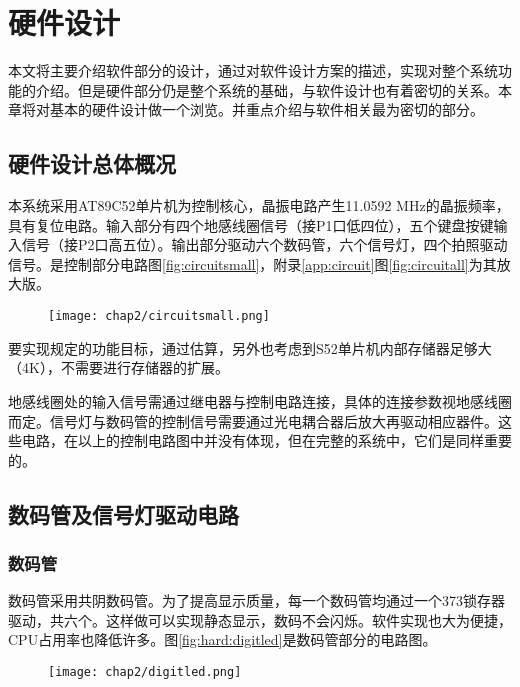 

\chapter{硬件设计}
\label{chap:hardware}
	本文将主要介绍软件部分的设计，通过对软件设计方案的描述，实现对整个系统功能的介绍。但是硬件部分仍是整个系统的基础，与软件设计也有着密切的关系。本章将对基本的硬件设计做一个浏览。并重点介绍与软件相关最为密切的部分。
\section{硬件设计总体概况}
	本系统采用AT89C52单片机为控制核心，晶振电路产生11.0592 MHz的晶振频率，具有复位电路。输入部分有四个地感线圈信号（接P1口低四位），五个键盘按键输入信号（接P2口高五位）。输出部分驱动六个数码管，六个信号灯，四个拍照驱动信号。是控制部分电路图\ref{fig:circuitsmall}，附录\ref{app:circuit}图\ref{fig:circuitall}为其放大版。
	
\begin{figure}[!tbh]
  \centering
  \texttt{[image: chap2/circuitsmall.png]}
\end{figure}
	要实现规定的功能目标，通过估算，另外也考虑到S52单片机内部存储器足够大（4K），不需要进行存储器的扩展。
	
	地感线圈处的输入信号需通过继电器与控制电路连接，具体的连接参数视地感线圈而定。信号灯与数码管的控制信号需要通过光电耦合器后放大再驱动相应器件。这些电路，在以上的控制电路图中并没有体现，但在完整的系统中，它们是同样重要的。
	
\section{数码管及信号灯驱动电路}
	
	\subsection{数码管}
	数码管采用共阴数码管。为了提高显示质量，每一个数码管均通过一个373锁存器驱动，共六个。这样做可以实现静态显示，数码不会闪烁。软件实现也大为便捷，CPU占用率也降低许多。图\ref{fig:hard:digitled}是数码管部分的电路图。
	\begin{figure}[!tbh]
	\centering
	\texttt{[image: chap2/digitled.png]}
	\end{figure}
	
